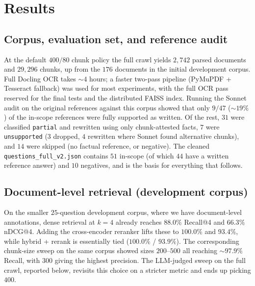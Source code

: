 \documentclass[fleqn,moreauthors,10pt]{ds_report}
\begin{document}

\section*{Results}

\subsection*{Corpus, evaluation set, and reference audit}
At the default $400/80$ chunk policy the full crawl yields $2{,}742$ parsed documents and $29{,}296$ chunks, up from the $176$ documents in the initial development corpus. Full Docling OCR takes $\sim4$ hours; a faster two-pass pipeline (PyMuPDF + Tesseract fallback) was used for most experiments, with the full OCR pass reserved for the final tests and the distributed FAISS index. Running the Sonnet audit on the original references against this corpus showed that only $9/47$ ($\sim19\%$) of the in-scope references were fully supported as written. Of the rest, $31$ were classified \texttt{partial} and rewritten using only chunk-attested facts, $7$ were \texttt{unsupported} ($3$ dropped, $4$ rewritten where Sonnet found alternative chunks), and $14$ were skipped (no factual reference, or negative). The cleaned \texttt{questions\_full\_v2.json} contains $51$ in-scope (of which $44$ have a written reference answer) and $10$ negatives, and is the basis for everything that follows.

\subsection*{Document-level retrieval (development corpus)}
On the smaller $25$-question development corpus, where we have document-level annotations, dense retrieval at $k{=}4$ already reaches $88.0\%$ Recall@4 and $66.3\%$ nDCG@4. Adding the cross-encoder reranker lifts these to $100.0\%$ and $93.4\%$, while hybrid + rerank is essentially tied ($100.0\%$ / $93.9\%$). The corresponding chunk-size sweep on the same corpus showed sizes $200$--$500$ all reaching $\sim97.9\%$ Recall, with $300$ giving the highest precision. The LLM-judged sweep on the full crawl, reported below, revisits this choice on a stricter metric and ends up picking $400$.
\end{document}
